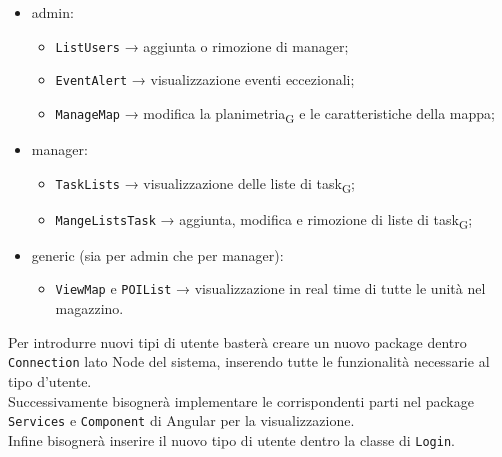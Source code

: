 \begin{itemize}
	\item admin:
	\begin{itemize}
		\item \texttt{ListUsers} → aggiunta o rimozione di manager;
		\item \texttt{EventAlert} → visualizzazione eventi eccezionali;
		\item \texttt{ManageMap} → modifica la planimetria\textsubscript{G} e le caratteristiche della mappa;
	\end{itemize}
	\item manager:
	\begin{itemize}
		\item \texttt{TaskLists} → visualizzazione delle liste di task\textsubscript{G};
		\item \texttt{MangeListsTask} → aggiunta, modifica e rimozione di liste di task\textsubscript{G};
	\end{itemize}
	\item generic (sia per admin che per manager):
	\begin{itemize}
		\item \texttt{ViewMap} e \texttt{POIList} → visualizzazione in real time di tutte le unità nel magazzino.
	\end{itemize}
\end{itemize}

        Per introdurre nuovi tipi di utente basterà creare un nuovo package dentro \texttt{Connection} lato Node del sistema, inserendo tutte le funzionalità necessarie al tipo d'utente. \\Successivamente bisognerà implementare le corrispondenti parti nel package \texttt{Services} e \texttt{Component} di Angular per la visualizzazione. \\Infine bisognerà inserire il nuovo tipo di utente dentro la classe di \texttt{Login}.

